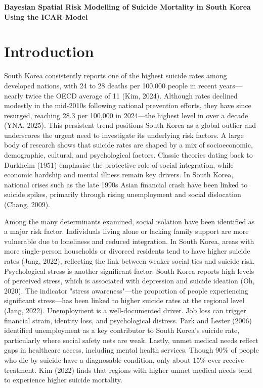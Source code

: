 \documentclass[11pt]{article}
\begin{document}
	
	\begin{center}
		\LARGE\textbf{Bayesian Spatial Risk Modelling of Suicide Mortality in South Korea Using the ICAR Model}
	\end{center}
	
	\section*{Introduction}
	
	South Korea consistently reports one of the highest suicide rates among developed nations, with 24 to 28 deaths per 100,000 people in recent years—nearly twice the OECD average of 11 (Kim, 2024). Although rates declined modestly in the mid-2010s following national prevention efforts, they have since resurged, reaching 28.3 per 100,000 in 2024—the highest level in over a decade (YNA, 2025). This persistent trend positions South Korea as a global outlier and underscores the urgent need to investigate its underlying risk factors. A large body of research shows that suicide rates are shaped by a mix of socioeconomic, demographic, cultural, and psychological factors. Classic theories dating back to Durkheim (1951) emphasise the protective role of social integration, while economic hardship and mental illness remain key drivers. In South Korea, national crises such as the late 1990s Asian financial crash have been linked to suicide spikes, primarily through rising unemployment and social dislocation (Chang, 2009).
	
	Among the many determinants examined, social isolation have been identified as a major risk factor. Individuals living alone or lacking family support are more vulnerable due to loneliness and reduced integration. In South Korea, areas with more single-person households or divorced residents tend to have higher suicide rates (Jang, 2022), reflecting the link between weaker social ties and suicide risk. Psychological stress is another significant factor. South Korea reports high levels of perceived stress, which is associated with depression and suicide ideation (Oh, 2020). The indicator "stress awareness"—the proportion of people experiencing significant stress—has been linked to higher suicide rates at the regional level (Jang, 2022). Unemployment is a well-documented driver. Job loss can trigger financial strain, identity loss, and psychological distress. Park and Lester (2006) identified unemployment as a key contributor to South Korea's suicide rate, particularly where social safety nets are weak. Lastly, unmet medical needs reflect gaps in healthcare access, including mental health services. Though 90\% of people who die by suicide have a diagnosable condition, only about 15\% ever receive treatment. Kim (2022) finds that regions with higher unmet medical needs tend to experience higher suicide mortality.
	
\end{document}
